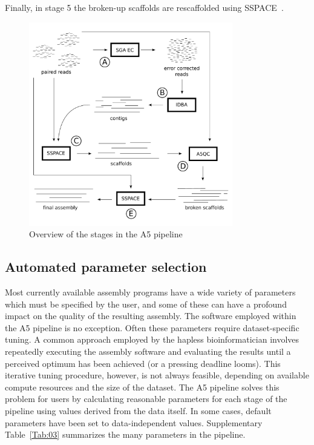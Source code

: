 \documentclass{bioinfo}
\begin{document}
\begin{methods}
Finally, in stage 5 the broken-up scaffolds are rescaffolded using SSPACE~\citep{Boetzer2011}.
\end{methods}


\begin{figure}[t]
\includegraphics[width=3.5in]{a5pipeline-diagram.pdf}
\vspace{-1cm}
\caption{Overview of the stages in the A5 pipeline}\label{fig:01}
\end{figure}

\subsection{Automated parameter selection}

Most currently available assembly programs have a wide variety of parameters which must
be specified by the user, and some of these can have a profound impact on the quality of the 
resulting assembly. The software employed within the A5 pipeline is no exception. 
Often these parameters require dataset-specific tuning.  A common approach
employed by the hapless bioinformatician involves repeatedly
executing the assembly software and evaluating the results until a perceived 
optimum has been achieved (or a pressing deadline looms). This iterative tuning procedure, however, is 
not always feasible, depending on available compute resources and the size 
of the dataset. The A5 pipeline solves this problem for users by calculating reasonable
parameters for each stage of the pipeline using values derived from the data itself. In some
cases, default parameters have been set to data-independent values. Supplementary Table~\ref{Tab:03} 
summarizes the many parameters in the pipeline.
\end{document}
